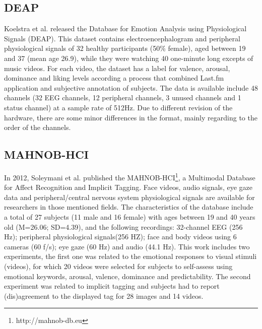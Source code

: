 \documentclass{sig-alternate}
\begin{document}
\subsection{DEAP}
Koelstra et al. \cite{deap2011} released the Database for Emotion Analysis 
using Physiological Signals (DEAP). This dataset contains electroencephalogram 
and peripheral physiological signals of 32 healthy participants (50\% female), 
aged between 19 and 37 (mean age 26.9), while they were watching
40 one-minute long excepts of music videos. For each video, the dataset has 
a label for valence, arousal, dominance and liking levels according a process 
that combined  Last.fm application and subjective annotation of subjects.  The data 
is available include 48 channels (32 EEG channels, 12 peripheral channels, 3 
unused channels and 1 status channel) at a sample rate of 512Hz. Due to
 different revision of the hardware, there are some minor differences in the 
 format, mainly regarding to the order of the  channels.

 \subsection{MAHNOB-HCI}
 In 2012, Soleymani et al. \cite{soleymani2012multimodal} published 
 the MAHNOB-HCI\footnote{http://mahnob-db.eu}, a Multimodal 
 Database for Affect Recognition and Implicit Tagging. Face videos,
  audio signals, eye gaze data and peripheral/central nervous system 
  physiological signals are available for researchers in those mentioned 
  fields. The characteristics of the database include a total of 27 
  subjects (11 male and 16 female) with ages between 19 and 40 years 
  old (M=26.06; SD=4.39), and the following recordings: 32-channel 
  EEG (256 Hz); peripheral physiological signals(256 HZ); face and 
  body videos using 6 cameras (60 f/s); eye gaze (60 Hz) and audio 
  (44.1 Hz). This work includes two experiments, the first one was 
  related to the emotional responses to visual stimuli (videos), for 
  which 20 videos were selected for subjects to self-assess using 
  emotional keywords, arousal, valence, dominance and predictability. 
  The second experiment was related to implicit tagging and subjects had to 
  report (dis)agreement to the displayed tag for 28 images and 14 videos.
 
\end{document}

